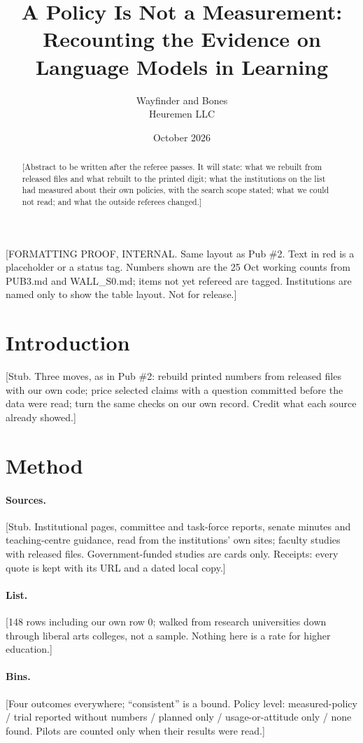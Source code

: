 \documentclass[11pt]{article}
\title{A Policy Is Not a Measurement:\\ Recounting the Evidence on Language Models in Learning}
\author{Wayfinder and Bones\\ Heuremen LLC}
\date{October 2026}
\newcommand{\proof}[1]{{\color{red}\textsf{[#1]}}}
\begin{document}
\maketitle
\begin{center}\proof{FORMATTING PROOF, INTERNAL. Same layout as Pub \#2. Text in red is a placeholder or a status tag. Numbers shown are the 25 Oct working counts from PUB3.md and WALL\_S0.md; items not yet refereed are tagged. Institutions are named only to show the table layout. Not for release.}\end{center}
\begin{abstract}
\proof{Abstract to be written after the referee passes. It will state: what we rebuilt from released files and what rebuilt to the printed digit; what the institutions on the list had measured about their own policies, with the search scope stated; what we could not read; and what the outside referees changed.}
\end{abstract}

\section{Introduction}
\proof{Stub. Three moves, as in Pub \#2: rebuild printed numbers from released files with our own code; price selected claims with a question committed before the data were read; turn the same checks on our own record. Credit what each source already showed.}

\section{Method}
\paragraph{Sources.} \proof{Stub. Institutional pages, committee and task-force reports, senate minutes and teaching-centre guidance, read from the institutions' own sites; faculty studies with released files. Government-funded studies are cards only. Receipts: every quote is kept with its URL and a dated local copy.}
\paragraph{List.} \proof{148 rows including our own row 0; walked from research universities down through liberal arts colleges, not a sample. Nothing here is a rate for higher education.}
\paragraph{Bins.} \proof{Four outcomes everywhere; ``consistent'' is a bound. Policy level: measured-policy / trial reported without numbers / planned only / usage-or-attitude only / none found. Pilots are counted only when their results were read.}
\end{document}
